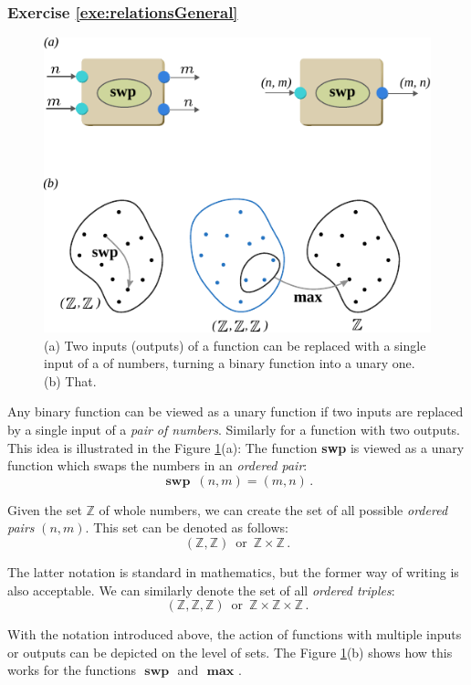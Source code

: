 \subsubsection*{Exercise \ref{exe:relationsGeneral}}
\begin{figure}[htbp]
  \centering
  \includegraphics[scale=1.0]{diagramProductSet}
  \caption{(a) Two inputs (outputs) of a function can be replaced with
    a single input of a  of numbers, turning a binary
    function into a unary one. (b) That.}
  \label{fig:diagramProductSet}
\end{figure}

Any binary function can be viewed as a unary function
if two inputs are replaced by a single input of a \emph{pair of
numbers}. Similarly for a function with two outputs. This idea is
illustrated in the Figure \ref{fig:diagramProductSet}(a): The function
{\bf swp} is viewed as a unary function which swaps the numbers in an
\emph{ordered pair}:
\[
\textbf{ swp }\,(n,m) = (m, n)\,.
\]

Given the set $\mathbb{Z}$ of whole numbers, we can create the set of
all possible \emph{ordered pairs} $(n,m)$. This set can be denoted as
follows:
\[
(\mathbb{Z}, \mathbb{Z})\,\textrm{ or }\, \mathbb{Z}\times\mathbb{Z}\,.
\]

The latter notation is standard in mathematics, but the former way
of writing is also acceptable. We can similarly denote the set of all
\emph{ordered triples}:
\[
(\mathbb{Z}, \mathbb{Z}, \mathbb{Z})\,\textrm{ or }\, \mathbb{Z}\times\mathbb{Z}\times\mathbb{Z}\,.
\]

With the notation introduced above, the action of functions with
multiple inputs or outputs can be depicted on the level of sets. The
 Figure \ref{fig:diagramProductSet}(b) shows how this works for the
 functions $\textbf{ swp }$ and $\textbf{ max }$.

